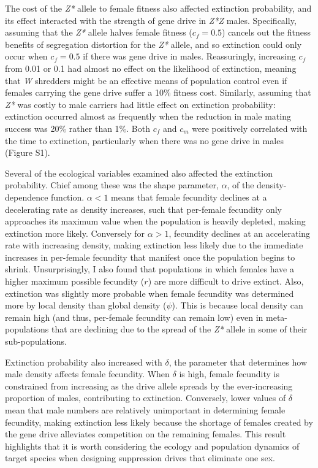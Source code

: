 \documentclass[]{rsos}%
\begin{document}
The cost of the \emph{Z*} allele to female fitness also affected
extinction probability, and its effect interacted with the strength of
gene drive in \emph{Z*Z} males. Specifically, assuming that the
\emph{Z*} allele halves female fitness (\(c_f = 0.5\)) cancels out the
fitness benefits of segregation distortion for the \emph{Z*} allele, and
so extinction could only occur when \(c_f = 0.5\) if there was gene
drive in males. Reassuringly, increasing \(c_f\) from 0.01 or 0.1 had
almost no effect on the likelihood of extinction, meaning that \emph{W}
shredders might be an effective means of population control even if
females carrying the gene drive suffer a 10\% fitness cost. Similarly,
assuming that \emph{Z*} was costly to male carriers had little effect on
extinction probability: extinction occurred almost as frequently when
the reduction in male mating success was 20\% rather than 1\%. Both
\(c_f\) and \(c_m\) were positively correlated with the time to
extinction, particularly when there was no gene drive in males (Figure
S1).

Several of the ecological variables examined also affected the
extinction probability. Chief among these was the shape parameter,
\(\alpha\), of the density-dependence function. \(\alpha < 1\) means
that female fecundity declines at a decelerating rate as density
increases, such that per-female fecundity only approaches its maximum
value when the population is heavily depleted, making extinction more
likely. Conversely for \(\alpha > 1\), fecundity declines at an
accelerating rate with increasing density, making extinction less likely
due to the immediate increases in per-female fecundity that manifest
once the population begins to shrink. Unsurprisingly, I also found that
populations in which females have a higher maximum possible fecundity
(\(r\)) are more difficult to drive extinct. Also, extinction was
slightly more probable when female fecundity was determined more by
local density than global density (\(\psi\)). This is because local
density can remain high (and thus, per-female fecundity can remain low)
even in meta-populations that are declining due to the spread of the
\emph{Z*} allele in some of their sub-populations.

Extinction probability also increased with \(\delta\), the parameter
that determines how male density affects female fecundity. When
\(\delta\) is high, female fecundity is constrained from increasing as
the drive allele spreads by the ever-increasing proportion of males,
contributing to extinction. Conversely, lower values of \(\delta\) mean
that male numbers are relatively unimportant in determining female
fecundity, making extinction less likely because the shortage of females
created by the gene drive alleviates competition on the remaining
females. This result highlights that it is worth considering the ecology
and population dynamics of target species when designing suppression
drives that eliminate one sex.
\end{document}
